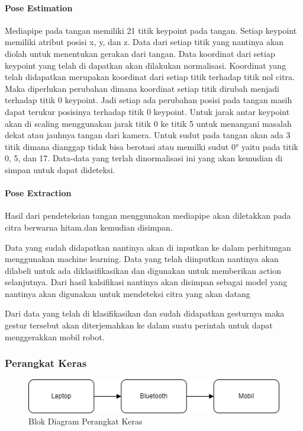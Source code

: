 \paragraph{Pose Estimation}
Mediapipe pada tangan memiliki 21 titik keypoint pada tangan. Setiap keypoint memiliki atribut posisi x, y, dan z. Data dari setiap titik yang nantinya akan diolah untuk menentukan gerakan dari tangan. Data koordinat dari setiap keypoint yang telah di dapatkan akan dilakukan normalisasi. Koordinat yang telah didapatkan merupakan koordinat dari setiap titik terhadap titik nol citra. Maka diperlukan perubahan dimana  koordinat setiap titik dirubah menjadi terhadap titik 0 keypoint. Jadi setiap ada perubahan posisi pada tangan masih dapat terukur posisinya terhadap titik 0 keypoint. Untuk jarak antar keypoint akan di scaling menggunakan jarak titik 0 ke titik 5 untuk menangani masalah dekat atau jauhnya tangan dari kamera. Untuk sudut pada tangan akan ada 3 titik dimana dianggap tidak bisa berotasi atau memilki sudut 0° yaitu pada titik 0, 5, dan 17. Data-data yang terlah dinormalisasi ini yang akan kemudian di simpan untuk dapat dideteksi.

\paragraph{Pose Extraction}
Hasil dari pendeteksian tangan menggunakan mediapipe akan diletakkan pada citra berwarna hitam.dan kemudian disimpan.



Data yang sudah didapatkan nantinya akan di inputkan ke dalam perhitungan menggunakan machine learning. Data yang telah diinputkan nantinya akan dilabeli untuk ada diklasifikasikan dan digunakan untuk memberikan action selanjutnya. Dari hasil kalsifikasi nantinya akan disimpan sebagai model yang nantinya akan digunakan untuk mendeteksi citra yang akan datang

Dari data yang telah di klasifikasikan dan sudah didapatkan gesturnya maka gestur tersebut akan diterjemahkan ke dalam suatu perintah untuk dapat menggerakkan mobil robot.

\subsubsection{Perangkat Keras}

\begin{figure}
	\centering
	\includegraphics[width=0.7\linewidth]{"gambar/gambar perangkat keras"}
	\caption{Blok Diagram Perangkat Keras}
	\label{fig:gambar-perangkat-keras}
\end{figure}

